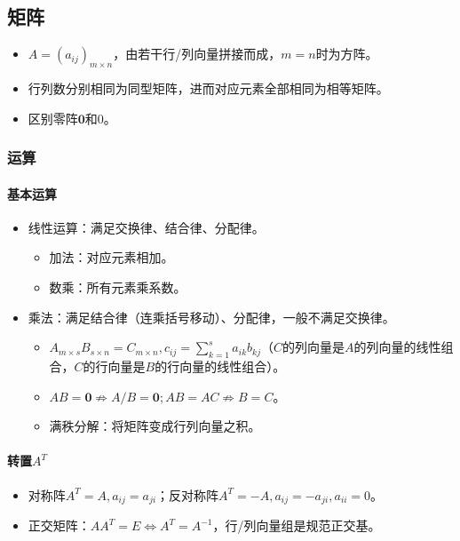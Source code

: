 \documentclass[
12pt, %
a4paper, 
oneside, %
headinclude,footinclude, %
]{scrartcl}
\begin{document}
\subsection[矩阵]{矩阵}
\begin{itemize}
\item $ A = (a_{ij})_{m \times n} $，由若干行/列向量拼接而成，$ m = n $时为方阵。
\item 行列数分别相同为同型矩阵，进而对应元素全部相同为相等矩阵。
\item 区别零阵$ \mathbf{0} $和$ 0 $。
\end{itemize}
\subsubsection[运算]{运算}
\paragraph{基本运算}
\begin{itemize}
\item 线性运算：满足交换律、结合律、分配律。
\begin{itemize}
\item 加法：对应元素相加。
\item 数乘：所有元素乘系数。
\end{itemize}
\item 乘法：满足结合律（连乘括号移动）、分配律，一般不满足交换律。
\begin{itemize}
\item $ A_{m \times s}B_{s \times n} = C_{m \times n}, c_{ij} = \sum_{k = 1}^s a_{ik}b_{kj} $（$ C $的列向量是$ A $的列向量的线性组合，$ C $的行向量是$ B $的行向量的线性组合）。
\item $ AB = \mathbf{0} \nRightarrow A/B = \mathbf{0}; AB = AC \nRightarrow B = C $。
\item 满秩分解：将矩阵变成行列向量之积。
\end{itemize}
\end{itemize}
\paragraph{转置$ A^T $}
\begin{itemize}
\item 对称阵$ A^T = A, a_{ij} = a_{ji} $；反对称阵$ A^T = -A, a_{ij} = -a_{ji}, a_{ii} = 0 $。
\item 正交矩阵：$ AA^T = E \Leftrightarrow A^T = A^{-1} $，行/列向量组是规范正交基。
\end{itemize}
\end{document}

